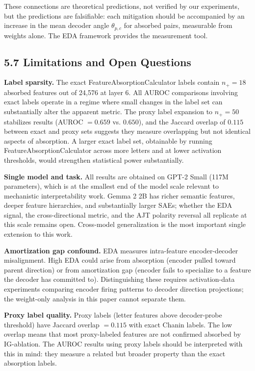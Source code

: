 \documentclass{article}
\begin{document}
These connections are theoretical predictions, not verified by our experiments, but the
predictions are falsifiable: each mitigation should be accompanied by an increase in the
mean decoder angle $\theta_{p,c}$ for absorbed pairs, measurable from weights alone. The
EDA framework provides the measurement tool.

\subsection{5.7 Limitations and Open Questions}

\textbf{Label sparsity.} The exact FeatureAbsorptionCalculator labels contain $n_+ = 18$ absorbed
features out of 24,576 at layer 6. All AUROC comparisons involving exact labels operate in a
regime where small changes in the label set can substantially alter the apparent metric. The
proxy label expansion to $n_+ = 50$ stabilizes results (AUROC $= 0.659$ vs. $0.650$), and the
Jaccard overlap of $0.115$ between exact and proxy sets suggests they measure overlapping but
not identical aspects of absorption. A larger exact label set, obtainable by running
FeatureAbsorptionCalculator across more letters and at lower activation thresholds, would
strengthen statistical power substantially.

\textbf{Single model and task.} All results are obtained on GPT-2 Small (117M parameters), which
is at the smallest end of the model scale relevant to mechanistic interpretability work.
Gemma 2 2B has richer semantic features, deeper feature hierarchies, and substantially larger
SAEs; whether the EDA signal, the cross-directional metric, and the AJT polarity reversal
all replicate at this scale remains open. Cross-model generalization is the most important
single extension to this work.

\textbf{Amortization gap confound.} EDA measures intra-feature encoder-decoder misalignment.
High EDA could arise from absorption (encoder pulled toward parent direction) or from
amortization gap (encoder fails to specialize to a feature the decoder has committed to).
Distinguishing these requires activation-data experiments comparing encoder firing patterns to
decoder direction projections; the weight-only analysis in this paper cannot separate them.

\textbf{Proxy label quality.} Proxy labels (letter features above decoder-probe threshold) have
Jaccard overlap $= 0.115$ with exact Chanin labels. The low overlap means that most proxy-labeled
features are not confirmed absorbed by IG-ablation. The AUROC results using proxy labels should
be interpreted with this in mind: they measure a related but broader property than the exact
absorption labels.
\end{document}
